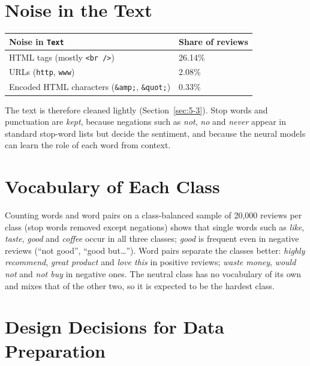 \section{Noise in the Text}
\label{sec:4-7}

\begin{center}
\begin{tabular}{@{}p{8cm}p{3cm}@{}}
    \toprule
    Noise in \texttt{Text} & Share of reviews \\
    \midrule
    HTML tags (mostly \texttt{<br />}) & 26.14\% \\
    URLs (\texttt{http}, \texttt{www}) & 2.08\% \\
    Encoded HTML characters (\texttt{\&amp;}, \texttt{\&quot;}) & 0.33\% \\
    \bottomrule
\end{tabular}
\end{center}

The text is therefore cleaned lightly (Section~\ref{sec:5-3}). Stop words and punctuation are \emph{kept}, because negations such as \emph{not}, \emph{no} and \emph{never} appear in standard stop-word lists but decide the sentiment, and because the neural models can learn the role of each word from context.

\section{Vocabulary of Each Class}
\label{sec:4-8}

Counting words and word pairs on a class-balanced sample of 20{,}000 reviews per class (stop words removed except negations) shows that single words such as \emph{like}, \emph{taste}, \emph{good} and \emph{coffee} occur in all three classes; \emph{good} is frequent even in negative reviews (``not good'', ``good but\ldots''). Word pairs separate the classes better: \emph{highly recommend}, \emph{great product} and \emph{love this} in positive reviews; \emph{waste money}, \emph{would not} and \emph{not buy} in negative ones. The neutral class has no vocabulary of its own and mixes that of the other two, so it is expected to be the hardest class.

\section{Design Decisions for Data Preparation}
\label{sec:4-9}

